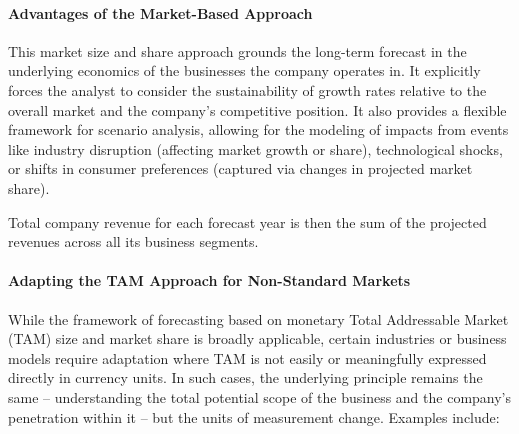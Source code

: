 \paragraph{Advantages of the Market-Based Approach}
This market size and share approach grounds the long-term forecast in the underlying economics of the businesses the company operates in. It explicitly forces the analyst to consider the sustainability of growth rates relative to the overall market and the company's competitive position. It also provides a flexible framework for scenario analysis, allowing for the modeling of impacts from events like industry disruption (affecting market growth or share), technological shocks, or shifts in consumer preferences (captured via changes in projected market share).

Total company revenue for each forecast year is then the sum of the projected revenues across all its business segments.

\paragraph{Adapting the TAM Approach for Non-Standard Markets} \label{par:non_monetary_tam}
While the framework of forecasting based on monetary Total Addressable Market (TAM) size and market share is broadly applicable, certain industries or business models require adaptation where TAM is not easily or meaningfully expressed directly in currency units. In such cases, the underlying principle remains the same – understanding the total potential scope of the business and the company's penetration within it – but the units of measurement change. Examples include:

